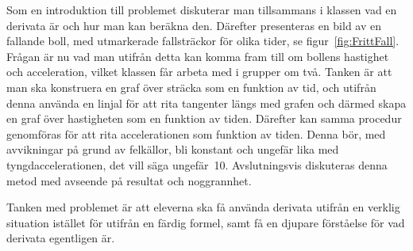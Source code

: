     \textcolor{lila}{Som en introduktion till problemet diskuterar man tillsammans i klassen vad en derivata är och hur man kan beräkna den. Därefter presenteras en bild av en fallande boll, med utmarkerade fallsträckor för olika tider, se figur~\ref{fig:FrittFall}. Frågan är nu vad man utifrån detta kan komma fram till om bollens hastighet och acceleration, vilket klassen får arbeta med i grupper om två. Tanken är att man ska konstruera en graf över sträcka som en funktion av tid, och utifrån denna använda en linjal för att rita tangenter längs med grafen och därmed skapa en graf över hastigheten som en funktion av tiden. Därefter kan samma procedur genomföras för att rita accelerationen som funktion av tiden. Denna bör, med avvikningar på grund av felkällor, bli konstant och ungefär lika med tyngdaccelerationen, det vill säga ungefär~10. Avslutningsvis diskuteras denna metod med avseende på resultat och noggrannhet.}
    
    \textcolor{lila}{Tanken med problemet är att eleverna ska få använda derivata utifrån en verklig situation istället för utifrån en färdig formel, samt få en djupare förståelse för vad derivata egentligen är.} 
        
